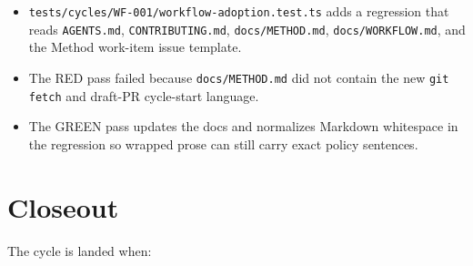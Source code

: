 \begin{itemize}
\tightlist
\item
  \texttt{t\allowbreak{}e\allowbreak{}s\allowbreak{}t\allowbreak{}s\allowbreak{}/\allowbreak{}c\allowbreak{}y\allowbreak{}c\allowbreak{}l\allowbreak{}e\allowbreak{}s\allowbreak{}/\allowbreak{}W\allowbreak{}F\allowbreak{}-\allowbreak{}0\allowbreak{}0\allowbreak{}1\allowbreak{}/\allowbreak{}w\allowbreak{}o\allowbreak{}r\allowbreak{}k\allowbreak{}f\allowbreak{}l\allowbreak{}o\allowbreak{}w\allowbreak{}-\allowbreak{}a\allowbreak{}d\allowbreak{}o\allowbreak{}p\allowbreak{}t\allowbreak{}i\allowbreak{}o\allowbreak{}n\allowbreak{}.\allowbreak{}t\allowbreak{}e\allowbreak{}s\allowbreak{}t\allowbreak{}.\allowbreak{}t\allowbreak{}s} adds a regression that reads \texttt{A\allowbreak{}G\allowbreak{}E\allowbreak{}N\allowbreak{}T\allowbreak{}S\allowbreak{}.\allowbreak{}m\allowbreak{}d}, \texttt{C\allowbreak{}O\allowbreak{}N\allowbreak{}T\allowbreak{}R\allowbreak{}I\allowbreak{}B\allowbreak{}U\allowbreak{}T\allowbreak{}I\allowbreak{}N\allowbreak{}G\allowbreak{}.\allowbreak{}m\allowbreak{}d}, \texttt{d\allowbreak{}o\allowbreak{}c\allowbreak{}s\allowbreak{}/\allowbreak{}M\allowbreak{}E\allowbreak{}T\allowbreak{}H\allowbreak{}O\allowbreak{}D\allowbreak{}.\allowbreak{}m\allowbreak{}d}, \texttt{d\allowbreak{}o\allowbreak{}c\allowbreak{}s\allowbreak{}/\allowbreak{}W\allowbreak{}O\allowbreak{}R\allowbreak{}K\allowbreak{}F\allowbreak{}L\allowbreak{}O\allowbreak{}W\allowbreak{}.\allowbreak{}m\allowbreak{}d}, and the Method work-item issue template.
\item
  The RED pass failed because \texttt{d\allowbreak{}o\allowbreak{}c\allowbreak{}s\allowbreak{}/\allowbreak{}M\allowbreak{}E\allowbreak{}T\allowbreak{}H\allowbreak{}O\allowbreak{}D\allowbreak{}.\allowbreak{}m\allowbreak{}d} did not contain the new \texttt{g\allowbreak{}i\allowbreak{}t\allowbreak{} \allowbreak{}f\allowbreak{}e\allowbreak{}t\allowbreak{}c\allowbreak{}h} and draft-PR cycle-start language.
\item
  The GREEN pass updates the docs and normalizes Markdown whitespace in the regression so wrapped prose can still carry exact policy sentences.
\end{itemize}

\section{Closeout}\label{record-208-closeout}

The cycle is landed when:

